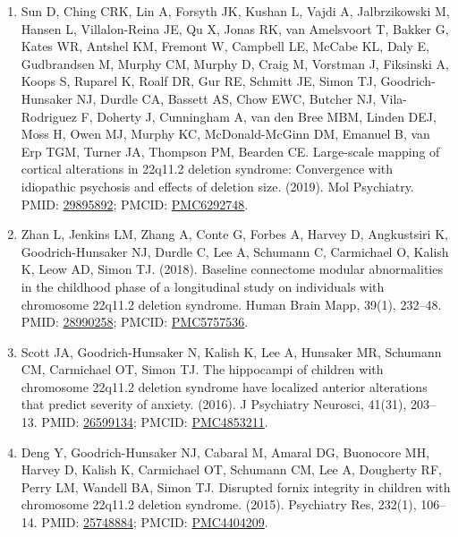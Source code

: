 \documentclass{nihbiosketch}
\begin{document}
\begin{enumerate}
\begin{enumerate}
	      	\item Sun D, Ching CRK, Lin A, Forsyth JK, Kushan L, Vajdi A, Jalbrzikowski M, Hansen L, Villalon-Reina JE, Qu X, Jonas RK, van Amelsvoort T, Bakker G, Kates WR, Antshel KM, Fremont W, Campbell LE, McCabe KL, Daly E, Gudbrandsen M, Murphy CM, Murphy D, Craig M, Vorstman J, Fiksinski A, Koops S, Ruparel K, Roalf DR, Gur RE, Schmitt JE, Simon TJ, Goodrich-Hunsaker NJ, Durdle CA, Bassett AS, Chow EWC, Butcher NJ, Vila-Rodriguez F, Doherty J, Cunningham A, van den Bree MBM, Linden DEJ, Moss H, Owen MJ, Murphy KC, McDonald-McGinn DM, Emanuel B, van Erp TGM, Turner JA, Thompson PM, Bearden CE. Large-scale mapping of cortical alterations in 22q11.2 deletion syndrome: Convergence with idiopathic psychosis and effects of deletion size. (2019). Mol Psychiatry. PMID: \href{https:/pubmed.gov/29895892}{29895892}; PMCID: \href{https://www.ncbi.nlm.nih.gov/pmc/articles/PMC6292748}{PMC6292748}.
	      	
	      	\item Zhan L, Jenkins LM, Zhang A, Conte G, Forbes A, Harvey D, Angkustsiri K, Goodrich-Hunsaker NJ, Durdle C, Lee A, Schumann C, Carmichael O, Kalish K, Leow AD, Simon TJ. (2018). Baseline connectome modular abnormalities in the childhood phase of a longitudinal study on individuals with chromosome 22q11.2 deletion syndrome. Human Brain Mapp, 39(1), 232--48. PMID: \href{https:/pubmed.gov/28990258}{28990258}; PMCID: \href{https://www.ncbi.nlm.nih.gov/pmc/articles/PMC5757536}{PMC5757536}.
	      	
	      	\item Scott JA, Goodrich-Hunsaker N, Kalish K, Lee A, Hunsaker MR, Schumann CM, Carmichael OT, Simon TJ. The hippocampi of children with chromosome 22q11.2 deletion syndrome have localized anterior alterations that predict severity of anxiety. (2016). J Psychiatry Neurosci, 41(31), 203--13. PMID: \href{https:/pubmed.gov/26599134}{26599134}; PMCID: \href{https://www.ncbi.nlm.nih.gov/pmc/articles/PMC4853211}{PMC4853211}.
	      	
	      	\item Deng Y, Goodrich-Hunsaker NJ, Cabaral M, Amaral DG, Buonocore MH, Harvey D, Kalish K, Carmichael OT, Schumann CM, Lee A, Dougherty RF, Perry LM, Wandell BA, Simon TJ. Disrupted fornix integrity in children with chromosome 22q11.2 deletion syndrome. (2015). Psychiatry Res, 232(1), 106--14. PMID: \href{https:/pubmed.gov/25748884}{25748884}; PMCID: \href{https://www.ncbi.nlm.nih.gov/pmc/articles/PMC4404209}{PMC4404209}.
	      	      

\end{enumerate}
\end{enumerate}
\end{document}
